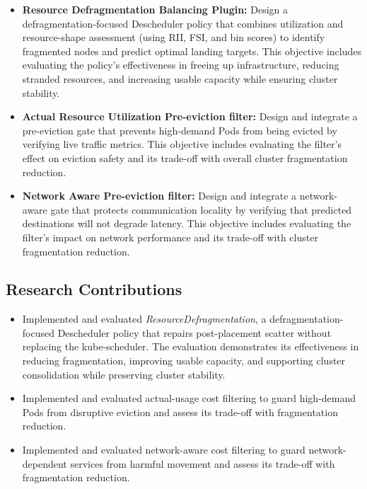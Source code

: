 \begin{itemize}
    \item \textbf{Resource Defragmentation Balancing Plugin:} Design a defragmentation-focused Descheduler policy that combines utilization and resource-shape assessment (using RII, FSI, and bin scores) to identify fragmented nodes and predict optimal landing targets. This objective includes evaluating the policy's effectiveness in freeing up infrastructure, reducing stranded resources, and increasing usable capacity while ensuring cluster stability.
    \item \textbf{Actual Resource Utilization Pre-eviction filter:} Design and integrate a pre-eviction gate that prevents high-demand Pods from being evicted by verifying live traffic metrics. This objective includes evaluating the filter's effect on eviction safety and its trade-off with overall cluster fragmentation reduction.
    \item \textbf{Network Aware Pre-eviction filter:} Design and integrate a network-aware gate that protects communication locality by verifying that predicted destinations will not degrade latency. This objective includes evaluating the filter's impact on network performance and its trade-off with cluster fragmentation reduction.
\end{itemize}

\subsection{Research Contributions}
\label{sec:researchContributions}

\begin{itemize}
    \item Implemented and evaluated \textit{ResourceDefragmentation}, a defragmentation-focused Descheduler policy that repairs post-placement scatter without replacing the kube-scheduler. The evaluation demonstrates its effectiveness in reducing fragmentation, improving usable capacity, and supporting cluster consolidation while preserving cluster stability.
    \item Implemented and evaluated actual-usage cost filtering to guard high-demand Pods from disruptive eviction and assess its trade-off with fragmentation reduction.
    \item Implemented and evaluated network-aware cost filtering to guard network-dependent services from harmful movement and assess its trade-off with fragmentation reduction.
\end{itemize}

